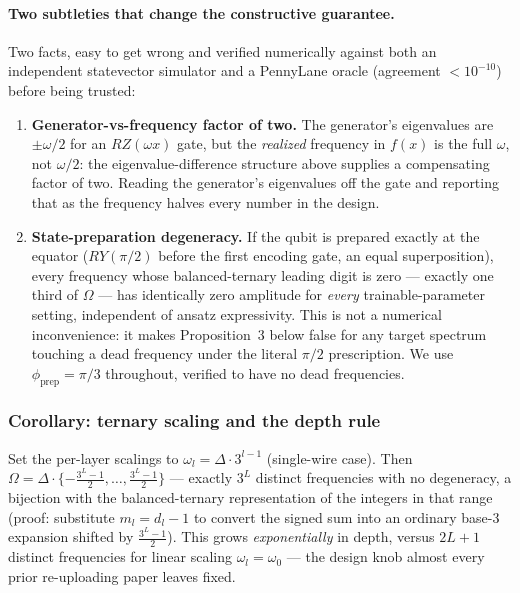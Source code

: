 \paragraph{Two subtleties that change the constructive guarantee.} Two facts, easy to get
wrong and verified numerically against both an independent statevector simulator and a
PennyLane oracle (agreement $<10^{-10}$) before being trusted:

\begin{enumerate}
\item \textbf{Generator-vs-frequency factor of two.} The generator's eigenvalues are
  $\pm\omega/2$ for an $RZ(\omega x)$ gate, but the \emph{realized} frequency in $f(x)$ is
  the full $\omega$, not $\omega/2$: the eigenvalue-difference structure above supplies a
  compensating factor of two. Reading the generator's eigenvalues off the gate and
  reporting that as the frequency halves every number in the design.
\item \textbf{State-preparation degeneracy.} If the qubit is prepared exactly at the
  equator ($RY(\pi/2)$ before the first encoding gate, an equal superposition), every
  frequency whose balanced-ternary leading digit is zero --- exactly one third of $\Omega$
  --- has identically zero amplitude for \emph{every} trainable-parameter setting,
  independent of ansatz expressivity. This is not a numerical inconvenience: it makes
  Proposition~3 below false for any target spectrum touching a dead frequency under the
  literal $\pi/2$ prescription. We use $\phi_{\mathrm{prep}}=\pi/3$ throughout, verified to
  have no dead frequencies.
\end{enumerate}

\subsubsection{Corollary: ternary scaling and the depth rule}

Set the per-layer scalings to $\omega_l = \Delta\cdot 3^{l-1}$ (single-wire case). Then
$\Omega = \Delta\cdot\{-\tfrac{3^L-1}{2},\dots,\tfrac{3^L-1}{2}\}$ --- exactly $3^L$
distinct frequencies with no degeneracy, a bijection with the balanced-ternary
representation of the integers in that range (proof: substitute $m_l=d_l-1$ to convert the
signed sum into an ordinary base-3 expansion shifted by $\tfrac{3^L-1}{2}$). This grows
\emph{exponentially} in depth, versus $2L+1$ distinct frequencies for linear scaling
$\omega_l=\omega_0$ --- the design knob almost every prior re-uploading paper leaves fixed.

